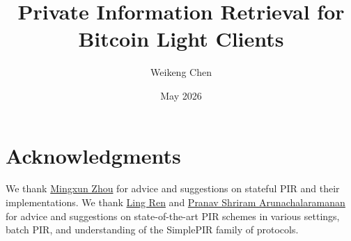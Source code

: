 \documentclass{article}
\title{Private Information Retrieval for Bitcoin Light Clients}
\author{Weikeng Chen}
\date{May 2026}
\begin{document}
\maketitle



\clearpage



\clearpage



\clearpage



\clearpage



\clearpage



\clearpage



\clearpage



\clearpage



\clearpage



\clearpage



\clearpage



\clearpage

\section*{Acknowledgments}

We thank \href{https://wuwuz.github.io/}{Mingxun Zhou} for advice and suggestions on stateful PIR and their implementations. We thank \href{https://sites.google.com/view/renling}{Ling Ren} and \href{https://scholar.google.com/citations?user=f54M0ikAAAAJ&hl=en}{Pranav Shriram Arunachalaramanan} for advice and suggestions on state-of-the-art PIR schemes in various settings, batch PIR, and understanding of the SimplePIR family of protocols.


\end{document}
